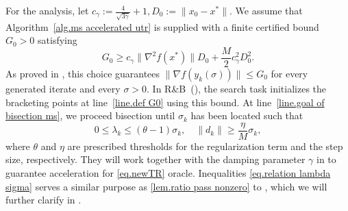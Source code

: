 \documentclass[moor,sglanonrev]{informs4}
\begin{document}
\begin{subroutine}[!ht]
    \caption{Ratio Bracketing and Bisection~(R\&B) for }\label{alg.bisection ms}
    \begin{algorithmic}[1]
        \label{line.early termination criterion}
        \label{line.early termination ms}
        \ELSE
        \label{line.goal of bisection ms}
        \STATE{$\sigma_+ =\sigma$}
        \STATE{$\sigma_- =\sigma$}
        \ENDIF
        \ENDWHILE
        \ENDIF
    \end{algorithmic}
\end{subroutine}
For the analysis, let
\(
    c_\gamma:=\frac{4}{\sqrt{3\gamma}}+1, D_0:=\|x_0-x^*\|.
\)
We assume that Algorithm~\ref{alg.ms accelerated utr} is supplied with a finite certified bound $G_0>0$ satisfying
\begin{equation}
    \label{eq.certified G0}
    G_0\geq c_\gamma\|\nabla^2 f(x^*)\|D_0+\frac{M}{2}c_\gamma^2D_0^2.
\end{equation}
As proved in , this choice guarantees
\(
\|\nabla f(y_k(\sigma))\|\leq G_0
\)
for every generated iterate and every $\sigma>0$.
In R\&B~(), the search task initializes the bracketing points at line~\ref{line.def G0} using this bound.
At line~\ref{line.goal of bisection ms}, we proceed bisection until $\sigma_k$ has been located such that
\begin{equation}
    \label{eq.relation lambda sigma}
    0 \leq \lambda_k \leq (\theta - 1)\sigma_k, \quad \|d_k\| \geq \frac{\eta}{M} \sigma_k,
\end{equation}
where $\theta$ and $\eta$ are prescribed thresholds for the regularization term and the step size, respectively. They will work together with the damping parameter $\gamma$ in  to guarantee acceleration for \ref{eq.newTR} oracle. Inequalities \eqref{eq.relation lambda sigma} serves a similar purpose as \eqref{lem.ratio pass nonzero} to , which we will further clarify in .
\end{document}

